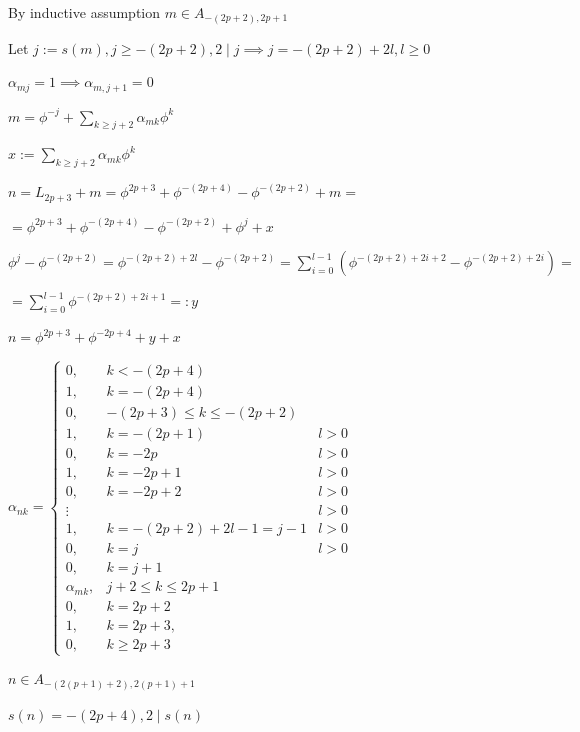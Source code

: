 \documentclass{article}
\begin{document}
By inductive assumption \( m \in A_{-(2p+2),2p+1} \)

Let \( j := s(m), j \geq -(2p+2), 2 \mid j \implies j = -(2p+2) + 2l, l \geq 0 \)

\( \alpha_{mj} = 1 \implies \alpha_{m,j+1} = 0 \)

\( m = \phi^{-j} + \sum_{k \geq j + 2} \alpha_{mk} \phi^k \)

\( x := \sum_{k \geq j + 2} \alpha_{mk} \phi^k \)

\( n = L_{2p+3} + m = \phi^{2p+3} + \phi^{-(2p+4)} - \phi^{-(2p+2)} + m = \)

\( = \phi^{2p+3} + \phi^{-(2p+4)} - \phi^{-(2p+2)} + \phi^j + x \)

\( \phi^j - \phi^{-(2p+2)} = \phi^{-(2p+2) + 2l} - \phi^{-(2p+2)} = \sum_{i=0}^{l-1}(\phi^{-(2p+2) + 2i+2} - \phi^{-(2p+2) + 2i}) = \)

\( = \sum_{i=0}^{l-1} \phi^{-(2p+2) + 2i+1} =: y \)

\( n = \phi^{2p+3} + \phi^{-2p+4} + y + x \)

\( \alpha_{nk} = \left\{\begin{array}{lll} 0, & k < -(2p+4)\\1, & k = -(2p+4)\\0, & -(2p+3) \leq k \leq -(2p+2)\\ 1, & k = -(2p+1) & l > 0 \\ 0, & k = -2p & l > 0 \\ 1, & k = -2p+1 & l >0 \\ 0, & k = -2p+2 & l >0\\ \vdots && l > 0 \\ 1, & k = -(2p+2) + 2l - 1 = j - 1 & l > 0 \\ 0, & k = j & l > 0 \\ 0, & k = j + 1\\ \alpha_{mk}, & j + 2 \leq k \leq 2p + 1 \\ 0, & k = 2p + 2\\ 1, & k = 2p+3, \\ 0, & k \geq 2p + 3 \end{array}\right. \)

\( n \in A_{-(2(p+1)+2),2(p+1)+1} \)

\( s(n) = -(2p+4), 2 \mid s(n) \)
\end{document}
